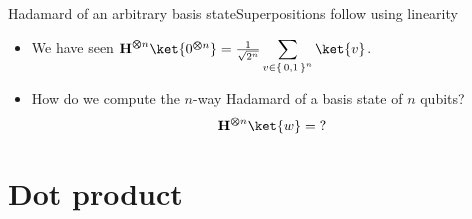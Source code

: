 \begin{frame}{Hadamard of an arbitrary basis state}{Superpositions follow using linearity}
\begin{itemize}
    \item We have seen $\TensSupProd{\Hadamard}{n}\ket{\TensSupProd{0}{n}}=\RootTwoN{n}\SumBV{v}{n}\ket{v}$.
    \item How do we compute the $n$-way Hadamard of a basis state  of $n$ qubits?
    \[
    \TensSupProd{\Hadamard}{n}\ket{w} = \mbox{?}
    \]
\end{itemize}
\end{frame}

\section*{Dot product}

